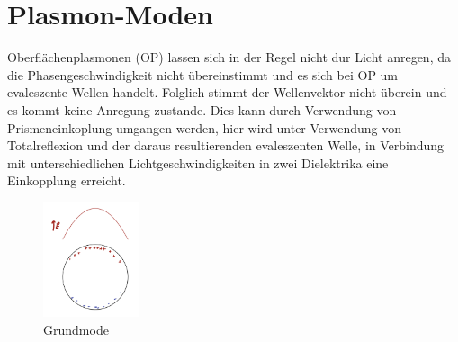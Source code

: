 
\section{Plasmon-Moden}

Oberflächenplasmonen (OP) lassen sich in der Regel nicht dur Licht anregen, da die Phasengeschwindigkeit nicht übereinstimmt und es sich bei OP um evaleszente Wellen handelt. Folglich stimmt der Wellenvektor nicht überein und es kommt keine Anregung zustande. Dies kann durch Verwendung von Prismeneinkoplung umgangen werden, hier wird unter Verwendung von Totalreflexion und der daraus resultierenden evaleszenten Welle, in Verbindung mit unterschiedlichen Lichtgeschwindigkeiten in zwei Dielektrika eine Einkopplung erreicht.

\begin{figure}[h]
    \centering
    \includegraphics[width=0.25\textwidth]{Bilder/Grundmode.jpeg}
    \caption{Grundmode}
\end{figure}